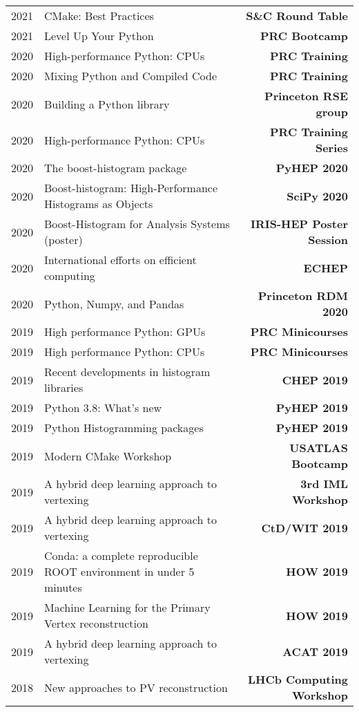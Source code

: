 \documentclass[10pt,letterpaper,english]{moderncv}
\begin{document}

\begin{tabularx}{\textwidth}{p{.35in}X>{\bfseries}r}
    2021 & CMake: Best Practices & S\&C Round Table \\
    2021 & Level Up Your Python & PRC Bootcamp \\
    2020 & High-performance Python: CPUs & PRC Training \\
    2020 & Mixing Python and Compiled Code & PRC Training \\
    2020 & Building a Python library & Princeton RSE group \\
    2020 & High-performance Python: CPUs & PRC Training Series \\
    2020 & The boost-histogram package & PyHEP 2020 \\
    2020 & Boost-histogram: High-Performance Histograms as Objects & SciPy 2020 \\
    2020 & Boost-Histogram for Analysis Systems (poster) & IRIS-HEP Poster Session \\
    2020 & International efforts on efficient computing & ECHEP \\
    2020 & Python, Numpy, and Pandas & Princeton RDM 2020 \\
    2019 & High performance Python: GPUs & PRC Minicourses \\
    2019 & High performance Python: CPUs & PRC Minicourses \\
    2019 & Recent developments in histogram libraries  & CHEP 2019 \\ 	
    2019 & Python 3.8: What's new & PyHEP 2019 \\ 	
    2019 & Python Histogramming packages & PyHEP 2019\\ 	
    2019 & Modern CMake Workshop & USATLAS Bootcamp \\ 	
    2019 & A hybrid deep learning approach to vertexing & 3rd IML Workshop \\ 	
    2019 & A hybrid deep learning approach to vertexing & CtD/WIT 2019 \\ 	
    2019 & Conda: a complete reproducible ROOT environment in under 5 minutes & HOW 2019 \\ 	
    2019 & Machine Learning for the Primary Vertex reconstruction & HOW 2019 \\ 	
    2019 & A hybrid deep learning approach to vertexing & ACAT 2019 \\ %
	2018 & New approaches to PV reconstruction & LHCb Computing Workshop \\ %

\end{tabularx}
\end{document}
